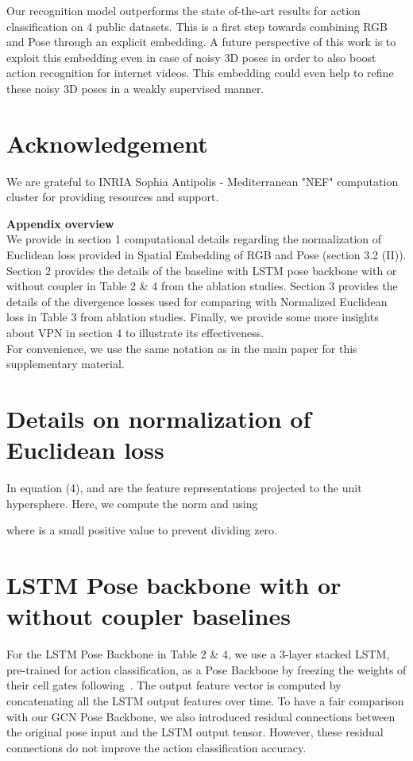\documentclass[runningheads]{llncs}
\begin{document}
 Our recognition model outperforms the state of-the-art results for action classification on 4 public datasets. 
This is a first step towards combining RGB and Pose through an explicit embedding. A future perspective of this work is to exploit this embedding even in case of noisy 3D poses in order to also boost action recognition for internet videos. This embedding could even help to refine these noisy 3D poses in a weakly supervised manner.

\section*{Acknowledgement}
We are grateful to INRIA Sophia Antipolis - Mediterranean "NEF" computation cluster for providing resources and support.


\newpage
\setcounter{section}{0}
\noindent \large{\textbf{Appendix overview}} \\
We provide in section 1 computational details regarding the normalization of Euclidean loss provided in Spatial Embedding of RGB and Pose (section 3.2 (II)). Section 2 provides the details of the baseline with LSTM pose backbone with or without coupler in Table 2 \& 4 from the ablation studies. Section 3 provides the details of the divergence losses used for comparing with Normalized Euclidean loss in Table 3 from ablation studies. Finally, we provide some more insights about VPN in section 4 to illustrate its effectiveness. \\
For convenience, we use the same notation as in the main paper for this supplementary material.

\section{Details on normalization of Euclidean loss}
In equation (4),  and  are the feature representations projected to the unit hypersphere. Here, we compute the norm  and  using

where  is a small positive value to prevent dividing zero.

\section{LSTM Pose backbone with or without coupler baselines}
For the LSTM Pose Backbone in Table 2 \& 4, we use a 3-layer stacked LSTM, pre-trained for action classification, as a Pose Backbone by freezing the weights of their cell gates following~\cite{STA_iccv}. The output feature vector  is computed by concatenating all the LSTM output features over time. To have a fair comparison with our GCN Pose Backbone, we also introduced residual connections between the original pose input and the LSTM output tensor. However, these residual connections do not improve the action classification accuracy. 
\end{document}
